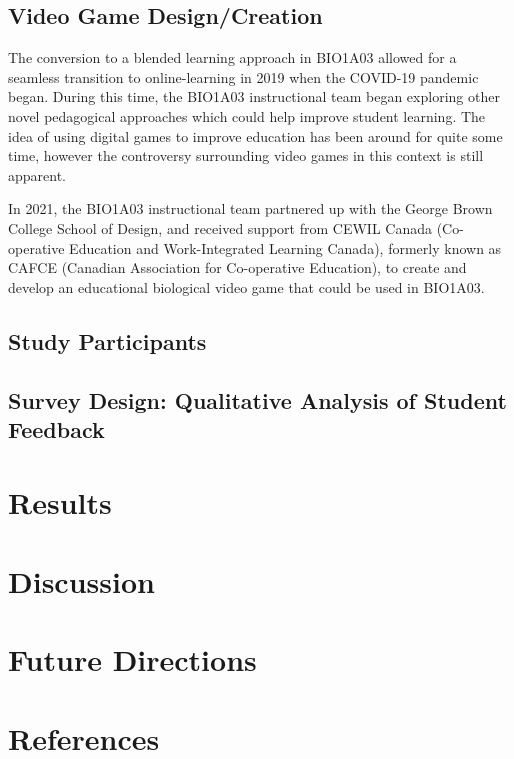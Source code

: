 \documentclass{article}
\begin{document}
\subsection{Video Game Design/Creation}

The conversion to a blended learning approach in BIO1A03 allowed for a seamless transition to online-learning in 2019 when the COVID-19 pandemic began. During this time, the BIO1A03 instructional team began exploring other novel pedagogical approaches which could help improve student learning. The idea of using digital games to improve education has been around for quite some time, however the controversy surrounding video games in this context is still apparent.

In 2021, the BIO1A03 instructional team partnered up with the George Brown College School of Design, and received support from CEWIL Canada (Co-operative Education and Work-Integrated Learning Canada), formerly known as CAFCE (Canadian Association for Co-operative Education), to create and develop an educational biological video game that could be used in BIO1A03.

\subsection{Study Participants}

\subsection{Survey Design: Qualitative Analysis of Student Feedback}

\section{Results}

\section{Discussion}

\section{Future Directions}



\clearpage\newpage
\section{References}


\nocite{*}
\printbibliography[heading=none, sorting=nyt]
\newpage
\end{document}
